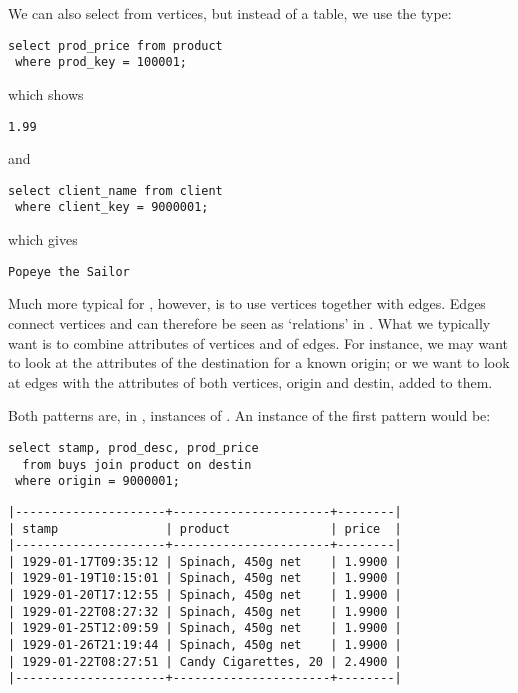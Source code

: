 We can also select from vertices,
but instead of a table, we use the type:

\begin{sqlcode}
\begin{lstlisting}
select prod_price from product
 where prod_key = 100001;
\end{lstlisting}
\end{sqlcode}

which shows
\begin{verbatim}
1.99
\end{verbatim}

and

\begin{sqlcode}
\begin{lstlisting}
select client_name from client
 where client_key = 9000001;
\end{lstlisting}
\end{sqlcode}

which gives
\begin{verbatim}
Popeye the Sailor
\end{verbatim}

Much more typical for \nowdb, however,
is to use vertices together with edges. Edges connect vertices
and can therefore be seen as `relations' in \nowdb.
What we typically want is to combine attributes
of vertices and of edges.
For instance, we may want to look at the attributes
of the destination for a known origin;
or we want to look at edges with the attributes
of both vertices, origin and destin, added to them.

Both patterns are, in \sql, instances of .
An instance of the first pattern would be:

\begin{sqlcode}
\begin{lstlisting}
select stamp, prod_desc, prod_price
  from buys join product on destin
 where origin = 9000001;
\end{lstlisting}
\end{sqlcode}

\begin{minipage}{\textwidth}
\begin{verbatim}
|---------------------+----------------------+--------|
| stamp               | product              | price  |
|---------------------+----------------------+--------|
| 1929-01-17T09:35:12 | Spinach, 450g net    | 1.9900 |
| 1929-01-19T10:15:01 | Spinach, 450g net    | 1.9900 |
| 1929-01-20T17:12:55 | Spinach, 450g net    | 1.9900 |
| 1929-01-22T08:27:32 | Spinach, 450g net    | 1.9900 |
| 1929-01-25T12:09:59 | Spinach, 450g net    | 1.9900 |
| 1929-01-26T21:19:44 | Spinach, 450g net    | 1.9900 |
| 1929-01-22T08:27:51 | Candy Cigarettes, 20 | 2.4900 |
|---------------------+----------------------+--------|
\end{verbatim}
\end{minipage}


